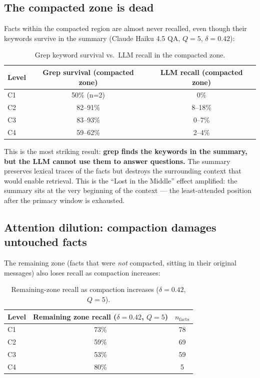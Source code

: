 \subsection{The compacted zone is dead}
\label{sec:dead-zone}

Facts within the compacted region are almost never recalled, even though
their keywords survive in the summary (Claude Haiku 4.5 QA, $Q=5$, $\delta=0.42$):

\begin{table}[h]
\centering
\caption{Grep keyword survival vs.\ LLM recall in the compacted zone.}
\label{tab:dead-zone}
\begin{tabular}{lcc}
\toprule
Level & Grep survival (compacted zone) & LLM recall (compacted zone) \\
\midrule
C1 & 50\% (n=2)  & 0\% \\
C2 & 82--91\%    & 8--18\% \\
C3 & 83--93\%    & 0--7\% \\
C4 & 59--62\%    & 2--4\% \\
\bottomrule
\end{tabular}
\end{table}

This is the most striking result: \textbf{grep finds the keywords in the summary,
but the LLM cannot use them to answer questions.} The summary preserves
lexical traces of the facts but destroys the surrounding context that would
enable retrieval. This is the ``Lost in the Middle'' effect amplified: the
summary sits at the very beginning of the context --- the least-attended
position after the primacy window is exhausted.

\subsection{Attention dilution: compaction damages untouched facts}
\label{sec:attention-dilution}

The remaining zone (facts that were \textit{not} compacted, sitting in their original
messages) also loses recall as compaction increases:

\begin{table}[h]
\centering
\caption{Remaining-zone recall as compaction increases ($\delta=0.42$, $Q=5$).}
\label{tab:remaining-zone}
\begin{tabular}{lcc}
\toprule
Level & Remaining zone recall ($\delta=0.42$, $Q=5$) & $n_{\text{facts}}$ \\
\midrule
C1 & 73\% & 78 \\
C2 & 59\% & 69 \\
C3 & 53\% & 59 \\
C4 & 80\% & 5 \\
\bottomrule
\end{tabular}
\end{table}

